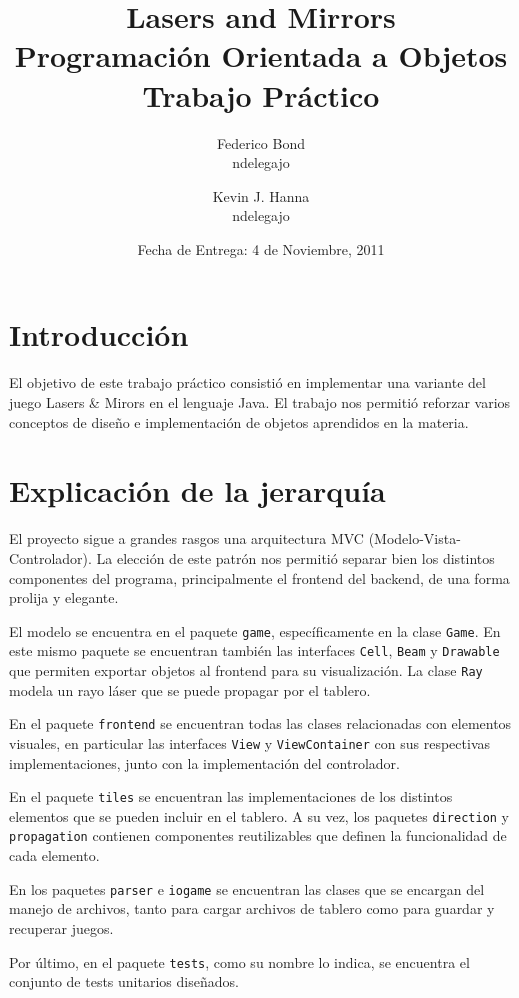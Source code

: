 \documentclass[a4paper, 11pt]{article}
\title{\Huge {Lasers and Mirrors} \\ Programación Orientada a Objetos\\[0.7cm] Trabajo Práctico}
\author{Federico Bond\\ndelegajo \and Kevin J. Hanna\\ndelegajo}
\date{Fecha de Entrega: 4 de Noviembre, 2011}
\begin{document}
 

\maketitle

\newpage
\tableofcontents
\clearpage 

\section{Introducción}
El objetivo de este trabajo práctico consistió en implementar una variante del juego Lasers \& Mirors en el lenguaje Java. El trabajo nos permitió reforzar varios conceptos de diseño e implementación de objetos aprendidos en la materia.

\section{Explicación de la jerarquía}
El proyecto sigue a grandes rasgos una arquitectura MVC (Modelo-Vista-Controlador). La elección de este patrón nos permitió separar bien los distintos componentes del programa, principalmente el frontend del backend, de una forma prolija y elegante.

El modelo se encuentra en el paquete \texttt{game}, específicamente en la clase \texttt{Game}. En este mismo paquete se encuentran también las interfaces \texttt{Cell}, \texttt{Beam} y \texttt{Drawable} que permiten exportar objetos al frontend para su visualización. La clase \texttt{Ray} modela un rayo láser que se puede propagar por el tablero.

En el paquete \texttt{frontend} se encuentran todas las clases relacionadas con elementos visuales, en particular las interfaces \texttt{View} y \texttt{ViewContainer} con sus respectivas implementaciones, junto con la implementación del controlador.

En el paquete \texttt{tiles} se encuentran las implementaciones de los distintos elementos que se pueden incluir en el tablero. A su vez, los paquetes \texttt{direction} y \texttt{propagation} contienen componentes reutilizables que definen la funcionalidad de cada elemento.

En los paquetes \texttt{parser} e \texttt{iogame} se encuentran las clases que se encargan del manejo de archivos, tanto para cargar archivos de tablero como para guardar y recuperar juegos.

Por último, en el paquete \texttt{tests}, como su nombre lo indica, se encuentra el conjunto de tests unitarios diseñados.
\end{document}
